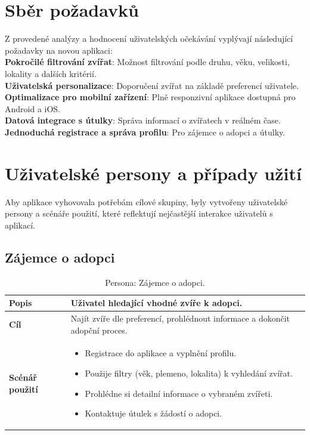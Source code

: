 \documentclass[12pt,a4paper]{report}
\begin{document}
\section{Sběr požadavků}

Z provedené analýzy a hodnocení uživatelských očekávání vyplývají následující požadavky na novou aplikaci:\\

\noindent \textbf{Pokročilé filtrování zvířat}: Možnost filtrování podle druhu, věku, velikosti, lokality a dalších kritérií.\\

\noindent \textbf{Uživatelská personalizace}: Doporučení zvířat na základě preferencí uživatele.\\

\noindent \textbf{Optimalizace pro mobilní zařízení}: Plně responzivní aplikace dostupná pro Android a iOS.\\

\noindent \textbf{Datová integrace s útulky}: Správa informací o zvířatech v reálném čase.\\

\noindent \textbf{Jednoduchá registrace a správa profilu}: Pro zájemce o adopci a útulky.\\

\section{Uživatelské persony a případy užití}

Aby aplikace vyhovovala potřebám cílové skupiny, byly vytvořeny uživatelské persony a scénáře použití, které reflektují nejčastější interakce uživatelů s aplikací.
\pagebreak
\subsection{Zájemce o adopci}
\begin{table}[h!]
    \centering
    \renewcommand{\arraystretch}{1.4}
    \begin{tabular}{|p{3cm}|p{10cm}|}
        \hline
        \textbf{Popis} & Uživatel hledající vhodné zvíře k adopci. \\ \hline
        \textbf{Cíl} & Najít zvíře dle preferencí, prohlédnout informace a dokončit adopční proces. \\ \hline
        \textbf{Scénář použití} &
        \begin{itemize}
            \item Registrace do aplikace a vyplnění profilu.
            \item Použije filtry (věk, plemeno, lokalita) k vyhledání zvířat.
            \item Prohlédne si detailní informace o vybraném zvířeti.
            \item Kontaktuje útulek s žádostí o adopci.
        \end{itemize} \\ \hline
    \end{tabular}
    \caption{Persona: Zájemce o adopci.}
    \label{tab:persona_adopter}
\end{table}
\end{document}
